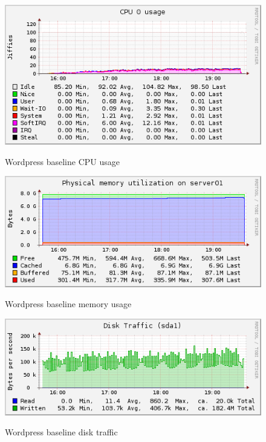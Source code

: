 \documentclass[Measurements]{subfiles}
\begin{document}
\begin{figure}[H]
\centering
\caption{Wordpress baseline CPU usage}
\includegraphics[scale=0.7]{images/results/baseline_wp/cpu.png}
\label{fig:Baseline Nginx CPU usage}
\end{figure}

\begin{figure}[H]
\centering
\caption{Wordpress baseline memory usage}
\includegraphics[scale=0.7]{images/results/baseline_wp/memory.png}
\label{fig:Baseline Nginx memory usage}
\end{figure}

\begin{figure}[H]
\centering
\caption{Wordpress baseline disk traffic}
\includegraphics[scale=0.7]{images/results/baseline_wp/disk.png}
\label{fig:Baseline Nginx disk traffic}
\end{figure}
\end{document}
